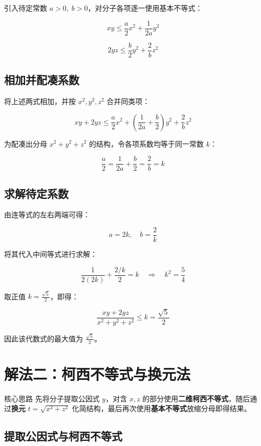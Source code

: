 \documentclass[11pt,a4paper]{ctexart}
\newcommand{\highlight}[1]{\colorbox{accent!20}{\sffamily\bfseries #1}}
\begin{document}
引入待定常数 $a>0,\; b>0$，对分子各项逐一使用基本不等式：

\[
xy \le \frac{a}{2}x^2 + \frac{1}{2a}y^2
\]

\[
2yz \le \frac{b}{2}y^2 + \frac{2}{b}z^2
\]

\subsection*{相加并配凑系数}

将上述两式相加，并按 $x^2,y^2,z^2$ 合并同类项：

\[
xy + 2yz \le \frac{a}{2}x^2 + \left(\frac{1}{2a} + \frac{b}{2}\right)y^2 + \frac{2}{b}z^2
\]

为配凑出分母 $x^2+y^2+z^2$ 的结构，令各项系数均等于同一常数 $k$：

\[
\frac{a}{2} = \frac{1}{2a} + \frac{b}{2} = \frac{2}{b} = k
\]

\subsection*{求解待定系数}

由连等式的左右两端可得：

\[
a = 2k,\quad b = \frac{2}{k}
\]

将其代入中间等式进行求解：

\[
\frac{1}{2(2k)} + \frac{2/k}{2} = k
\quad\Longrightarrow\quad
k^2 = \frac{5}{4}
\]

取正值 $k = \frac{\sqrt{5}}{2}$，即得：

\[
\boxed{\frac{xy + 2yz}{x^2 + y^2 + z^2} \le k = \frac{\sqrt{5}}{2}}
\]

因此该代数式的最大值为 $\displaystyle \frac{\sqrt{5}}{2}$。

\newpage

\section{解法二：柯西不等式与换元法}

\begin{methodbox}{核心思路}
先将分子提取公因式 $y$，对含 $x,z$ 的部分使用\highlight{二维柯西不等式}，随后通过\highlight{换元} $t=\sqrt{x^2+z^2}$ 化简结构，最后再次使用\highlight{基本不等式}放缩分母即得结果。
\end{methodbox}

\subsection*{提取公因式与柯西不等式}
\end{document}
